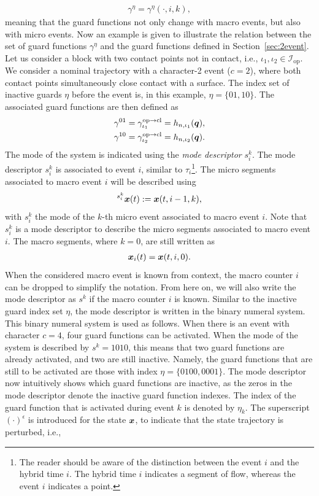 \documentclass[../DC2017114Bouma.tex]{subfiles}
\begin{document}
\begin{align}
\gamma^\eta = \gamma^\eta(\cdot,i,k),\label{eq:4gammaik}
\end{align}
meaning that the guard functions not only change with macro events, but also with micro events. Now an example is given to illustrate the relation between the set of guard functions $\gamma^\eta$ and the guard functions defined in Section~\ref{sec:2event}. Let us consider a block with two contact points not in contact, i.e., $\iota_1,\iota_2\in\mathcal{I}_{\text{op}}$. We consider a nominal trajectory with a character-2 event ($c=2$), where both contact points simultaneously close contact with a surface. The index set of inactive guards $\eta$ before the event is, in this example, $\eta = \{01,10\}$.  The associated guard functions are then defined as
\begin{align}
\gamma^{01} &= \gamma^{\text{op}\rightarrow\text{cl}}_{\iota_1} = h_{n,\iota_1}({\boldsymbol{q}}),\\
\gamma^{10} &= \gamma^{\text{op}\rightarrow\text{cl}}_{\iota_2} = h_{n,\iota_2}({\boldsymbol{q}}).
\end{align}
The mode of the system is indicated using the \textit{mode descriptor} $s^k_i$. The mode descriptor $s^k_i$ is associated to event $i$, similar to $\tau_i$\footnote{The reader should be aware of the distinction between the event $i$ and the hybrid time $i$. The hybrid time $i$ indicates a segment of flow, whereas the event $i$ indicates a point.}. The micro segments associated to macro event $i$ will be described using
\begin{align}
\hspace{0cm}^{s^k_i}{\boldsymbol{x}}(t) := {\boldsymbol{x}}(t,i-1,k),
\end{align}
with $s^k_i$ the mode of the $k$-th micro event associated to macro event $i$. Note that $s_i^k$ is a mode descriptor to describe the micro segments associated to macro event $i$. The macro segments, where $k=0$, are still written as 
\begin{align}
{\boldsymbol{x}}_i(t) = {\boldsymbol{x}}(t,i,0).
\end{align}
When the considered macro event is known from context, the macro counter $i$ can be dropped to simplify the notation. From here on, we will also write the mode descriptor as $s^k$ if the macro counter $i$ is known. Similar to the inactive guard index set $\eta$, the mode descriptor is written in the binary numeral system. This binary numeral system is used as follows. When there is an event with character $c = 4$, four guard functions can be activated. When the mode of the system is described by $s^k = 1010$, this means that two guard functions are already activated, and two are still inactive. Namely, the guard functions that are still to be activated are those with index $\eta = \{0100,0001\}$. The mode descriptor now intuitively shows which guard functions are inactive, as the zeros in the mode descriptor denote the inactive guard function indexes. The index of the guard function that is activated during event $k$ is denoted by $\eta_k$. The superscript $(\cdot)^{\epsilon}$ is introduced for the state ${\boldsymbol{x}}$, to indicate that the state trajectory is perturbed, i.e.,
\end{document}
